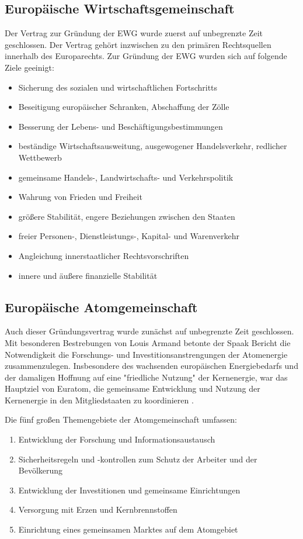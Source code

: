 \documentclass[12pt, oneside]{book} %
\begin{document}
\subsection{Europäische Wirtschaftsgemeinschaft}
Der Vertrag zur Gründung der EWG wurde zuerst auf unbegrenzte Zeit geschlossen. Der Vertrag gehört inzwischen zu den primären Rechtsquellen innerhalb des Europarechts. Zur Gründung der EWG wurden sich auf folgende Ziele geeinigt\parencite[]{EWG}: 

\begin{itemize}
    \item Sicherung des sozialen und wirtschaftlichen Fortschritts
    \item Beseitigung europäischer Schranken, Abschaffung der Zölle
    \item Besserung der Lebens- und Beschäftigungsbestimmungen
    \item beständige Wirtschaftsausweitung, ausgewogener Handelsverkehr, redlicher
    Wettbewerb
    \item gemeinsame Handels-, Landwirtschafts- und Verkehrspolitik
    \item Wahrung von Frieden und Freiheit
    \item größere Stabilität, engere Beziehungen zwischen den Staaten
    \item freier Personen-, Dienstleistungs-, Kapital- und Warenverkehr
    \item Angleichung innerstaatlicher Rechtsvorschriften
    \item innere und äußere finanzielle Stabilität
\end{itemize}


\subsection{Europäische Atomgemeinschaft}
Auch dieser Gründungsvertrag wurde zunächst auf unbegrenzte Zeit geschlossen. Mit besonderen Bestrebungen von Louis Armand betonte der Spaak Bericht die Notwendigkeit die Forschungs- und Investitionsanstrengungen der Atomenergie zusammenzulegen. Insbesondere des wachsenden europäischen Energiebedarfs und der damaligen Hoffnung auf eine "friedliche Nutzung" der Kernenergie, war das Hauptziel von Euratom, die gemeinsame Entwicklung und Nutzung der Kernenergie in den Mitgliedstaaten zu koordinieren \parencite[]{Spaak-Bericht}.
\par
Die fünf großen Themengebiete der Atomgemeinschaft umfassen:

\begin{enumerate}
    \item Entwicklung der Forschung und Informationsaustausch
    \item Sicherheitsregeln und -kontrollen zum Schutz der Arbeiter und der Bevölkerung
    \item Entwicklung der Investitionen und gemeinsame Einrichtungen
    \item Versorgung mit Erzen und Kernbrennstoffen
    \item Einrichtung eines gemeinsamen Marktes auf dem Atomgebiet
\end{enumerate}
\end{document}
